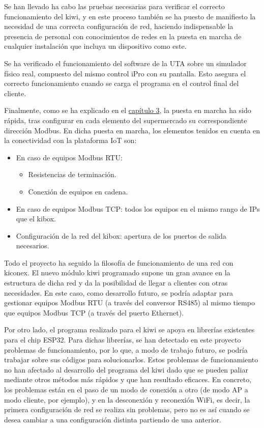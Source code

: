
Se han llevado ha cabo las pruebas necesarias para verificar el correcto funcionamiento del kiwi, y en este proceso también se ha puesto de manifiesto la necesidad de una correcta configuración de red, haciendo indispensable la presencia de personal con conocimientos de redes en la puesta en marcha de cualquier instalación que incluya un dispositivo como este.

Se ha verificado el funcionamiento del software de la UTA sobre un simulador físico real, compuesto del mismo control iPro con su pantalla. Esto asegura el correcto funcionamiento cuando se carga el programa en el control final del cliente.

Finalmente, como se ha explicado en el \hyperref[sec:altaInstalacion]{capítulo 3}, la puesta en marcha ha sido rápida, tras configurar en cada elemento del supermercado su correspondiente dirección Modbus. En dicha puesta en marcha, los elementos tenidos en cuenta en la conectividad con la plataforma IoT son:

\begin{itemize}
    \item En caso de equipos Modbus RTU: 
    \begin{itemize}
        \item Resistencias de terminación.
        \item Conexión de equipos en cadena.
    \end{itemize}
    \item En caso de equipos Modbus TCP: todos los equipos en el mismo rango de IPs que el kibox.
    \item Configuración de la red del kibox: apertura de los puertos de salida necesarios.
\end{itemize}

Todo el proyecto ha seguido la filosofía de funcionamiento de una red con kiconex. El nuevo módulo kiwi programado supone un gran avance en la estructura de dicha red y da la posibilidad de llegar a clientes con otras necesidades. En este caso, como desarrollo futuro, se podría adaptar para gestionar equipos Modbus RTU (a través del conversor RS485) al mismo tiempo que equipos Modbus TCP (a través del puerto Ethernet).

Por otro lado, el programa realizado para el kiwi se apoya en librerías existentes para el chip ESP32. Para dichas librerías, se han detectado en este proyecto problemas de funcionamiento, por lo que, a modo de trabajo futuro, se podría trabajar sobre sus códigos para solucionarlos. Estos problemas de funcionamiento no han afectado al desarrollo del programa del kiwi dado que se pueden paliar mediante otros métodos más rápidos y que han resultado eficaces. En concreto, los problemas están en el paso de un modo de conexión a otro (de modo AP a modo cliente, por ejemplo), y en la desconexión y reconexión WiFi, es decir, la primera configuración de red se realiza sin problemas, pero no es así cuando se desea cambiar a una configuración distinta partiendo de una anterior.




